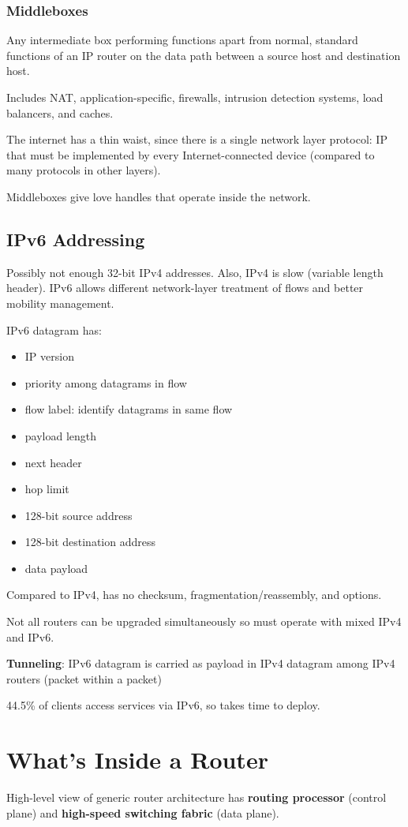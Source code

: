 \documentclass[11pt]{article}
\begin{document}
\subsubsection{Middleboxes}
\label{sec:org0c0c3a0}
Any intermediate box performing functions apart from normal, standard functions
of an IP router on the data path between a source host and destination host.

Includes NAT, application-specific, firewalls, intrusion detection systems,
load balancers, and caches.

The internet has a thin waist, since there is a single network layer protocol: IP
that must be implemented by every Internet-connected device (compared to
many protocols in other layers).

Middleboxes give love handles that operate inside the network.
\subsection{IPv6 Addressing}
\label{sec:org262310e}
Possibly not enough 32-bit IPv4 addresses. Also, IPv4 is slow (variable length header).
IPv6 allows different network-layer treatment of flows and better mobility management.

IPv6 datagram has:
\begin{itemize}
\item IP version
\item priority among datagrams in flow
\item flow label: identify datagrams in same flow
\item payload length
\item next header
\item hop limit
\item 128-bit source address
\item 128-bit destination address
\item data payload
\end{itemize}

Compared to IPv4, has no checksum, fragmentation/reassembly, and options.

Not all routers can be upgraded simultaneously so must operate with mixed IPv4
and IPv6.

\textbf{Tunneling}: IPv6 datagram is carried as payload in IPv4 datagram among IPv4
routers (packet within a packet)

44.5\% of clients access services via IPv6, so takes time to deploy.
\section{What's Inside a Router}
\label{sec:org7abf33c}
High-level view of generic router architecture has \textbf{routing processor} (control plane) and
\textbf{high-speed switching fabric} (data plane).
\end{document}

